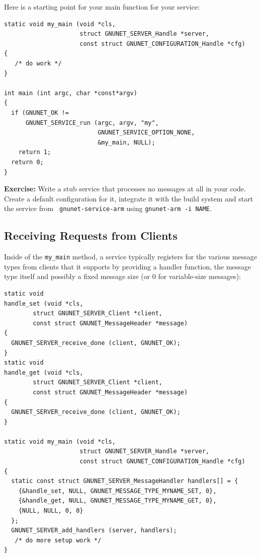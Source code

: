 \documentclass[10pt]{article}
\newcommand{\exercise}[1]{\noindent\begin{boxedminipage}{\textwidth}{\bf Exercise:} #1 \end{boxedminipage}}
\begin{document}
Here is a starting point for your main function for your service:

\lstset{language=c}
\begin{lstlisting}
static void my_main (void *cls,
                     struct GNUNET_SERVER_Handle *server,
                     const struct GNUNET_CONFIGURATION_Handle *cfg)
{ 
   /* do work */  
}

int main (int argc, char *const*argv) 
{
  if (GNUNET_OK != 
      GNUNET_SERVICE_run (argc, argv, "my", 
                          GNUNET_SERVICE_OPTION_NONE, 
                          &my_main, NULL);
    return 1;
  return 0;    
}
\end{lstlisting}

\exercise{Write a stub service that processes no messages at all
in your code.  Create a default configuration for it, integrate it
with the build system and start the service from {\tt
  gnunet-service-arm} using {\tt gnunet-arm -i NAME}.}


\subsection{Receiving Requests from Clients}

Inside of the {\tt my\_main} method, a service typically registers for
the various message types from clients that it supports by providing
a handler function, the message type itself and possibly a fixed
message size (or 0 for variable-size messages):

\lstset{language=c}
\begin{lstlisting}
static void
handle_set (void *cls,
	    struct GNUNET_SERVER_Client *client,
	    const struct GNUNET_MessageHeader *message)
{
  GNUNET_SERVER_receive_done (client, GNUNET_OK); 
}
static void
handle_get (void *cls,
	    struct GNUNET_SERVER_Client *client,
	    const struct GNUNET_MessageHeader *message)
{
  GNUNET_SERVER_receive_done (client, GNUNET_OK); 
}

static void my_main (void *cls,
                     struct GNUNET_SERVER_Handle *server,
                     const struct GNUNET_CONFIGURATION_Handle *cfg)
{ 
  static const struct GNUNET_SERVER_MessageHandler handlers[] = {
    {&handle_set, NULL, GNUNET_MESSAGE_TYPE_MYNAME_SET, 0},
    {&handle_get, NULL, GNUNET_MESSAGE_TYPE_MYNAME_GET, 0},
    {NULL, NULL, 0, 0}
  };
  GNUNET_SERVER_add_handlers (server, handlers);
   /* do more setup work */  
} 
\end{lstlisting}
\end{document}
